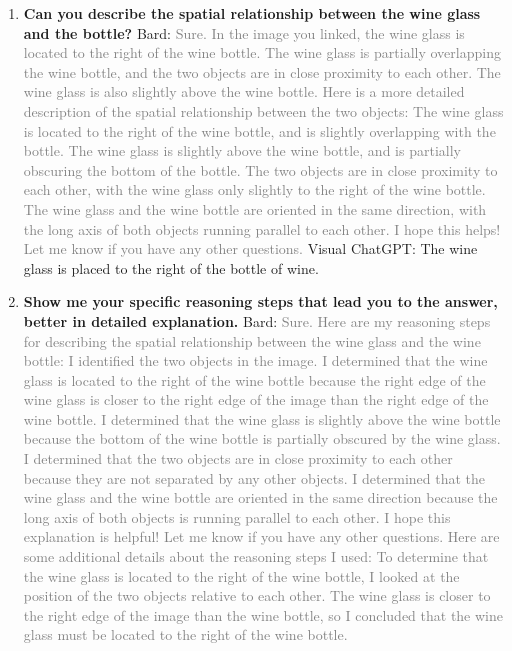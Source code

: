     \begin{enumerate}
        \item \textbf{Can you describe the spatial relationship between the wine glass and the bottle?}
        \subitem Bard: \textcolor{gray}{
        Sure. In the image you linked, the wine glass is located to the right of the wine bottle. The wine glass is partially overlapping the wine bottle, and the two objects are in close proximity to each other. The wine glass is also slightly above the wine bottle.
        Here is a more detailed description of the spatial relationship between the two objects:
        The wine glass is located to the right of the wine bottle, and is slightly overlapping with the bottle.
        The wine glass is slightly above the wine bottle, and is partially obscuring the bottom of the bottle.
        The two objects are in close proximity to each other, with the wine glass only slightly to the right of the wine bottle.
        The wine glass and the wine bottle are oriented in the same direction, with the long axis of both objects running parallel to each other.
        I hope this helps! Let me know if you have any other questions.}
        \subitem Visual ChatGPT: The wine glass is placed to the right of the bottle of wine.
        \item \textbf{Show me your specific reasoning steps that lead you to the answer, better in detailed explanation.}
        \subitem Bard: \textcolor{gray}{Sure. Here are my reasoning steps for describing the spatial relationship between the wine glass and the wine bottle:
        I identified the two objects in the image.
        I determined that the wine glass is located to the right of the wine bottle because the right edge of the wine glass is closer to the right edge of the image than the right edge of the wine bottle.
        I determined that the wine glass is slightly above the wine bottle because the bottom of the wine bottle is partially obscured by the wine glass.
        I determined that the two objects are in close proximity to each other because they are not separated by any other objects.
        I determined that the wine glass and the wine bottle are oriented in the same direction because the long axis of both objects is running parallel to each other.
        I hope this explanation is helpful! Let me know if you have any other questions.
        Here are some additional details about the reasoning steps I used:
        To determine that the wine glass is located to the right of the wine bottle, I looked at the position of the two objects relative to each other. The wine glass is closer to the right edge of the image than the wine bottle, so I concluded that the wine glass must be located to the right of the wine bottle.
}
\end{enumerate}
